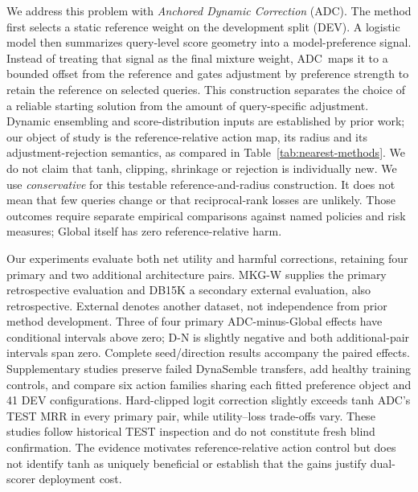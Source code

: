 \documentclass[11pt,a4paper]{article}
\newcommand{\adc}{\textsc{ADC}}
\begin{document}
We address this problem with \emph{Anchored Dynamic Correction} (\adc). The method first selects a static reference weight on the development split (DEV). A logistic model then summarizes query-level score geometry into a model-preference signal. Instead of treating that signal as the final mixture weight, \adc\ maps it to a bounded offset from the reference and gates adjustment by preference strength to retain the reference on selected queries. This construction separates the choice of a reliable starting solution from the amount of query-specific adjustment. Dynamic ensembling and score-distribution inputs are established by prior work; our object of study is the reference-relative action map, its radius and its adjustment-rejection semantics, as compared in Table~\ref{tab:nearest-methods}. We do not claim that tanh, clipping, shrinkage or rejection is individually new.
We use \emph{conservative} for this testable reference-and-radius construction. It does not mean that few queries change or that reciprocal-rank losses are unlikely. Those outcomes require separate empirical comparisons against named policies and risk measures; Global itself has zero reference-relative harm.

Our experiments evaluate both net utility and harmful corrections, retaining four primary and two additional architecture pairs. MKG-W supplies the primary retrospective evaluation and DB15K a secondary external evaluation, also retrospective. External denotes another dataset, not independence from prior method development. Three of four primary ADC-minus-Global effects have conditional intervals above zero; D-N is slightly negative and both additional-pair intervals span zero. Complete seed/direction results accompany the paired effects. Supplementary studies preserve failed DynaSemble transfers, add healthy training controls, and compare six action families sharing each fitted preference object and 41 DEV configurations. Hard-clipped logit correction slightly exceeds tanh ADC's TEST MRR in every primary pair, while utility--loss trade-offs vary. These studies follow historical TEST inspection and do not constitute fresh blind confirmation. The evidence motivates reference-relative action control but does not identify tanh as uniquely beneficial or establish that the gains justify dual-scorer deployment cost.
\end{document}
